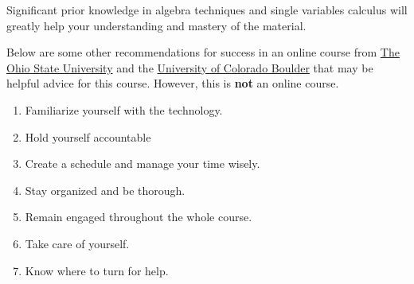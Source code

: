 \documentclass[11pt]{article}
\begin{document}
Significant prior knowledge in algebra techniques and single variables calculus will greatly help your understanding and mastery of the material.

Below are some other recommendations for success in an online course from \href{https://online.osu.edu/resources/learn/5-online-learning-tips-student-success}{The Ohio State University} and the \href{https://www.colorado.edu/health/tips-succeeding-online-classes}{University of Colorado Boulder} that may be helpful advice for this course. However, this is \textbf{not} an online course.

\begin{enumerate}
\item Familiarize yourself with the technology.
\item Hold yourself accountable
\item Create a schedule and manage your time wisely.
\item Stay organized and be thorough.
\item Remain engaged throughout the whole course.
\item Take care of yourself.
\item Know where to turn for help.
\end{enumerate}
\end{document}
